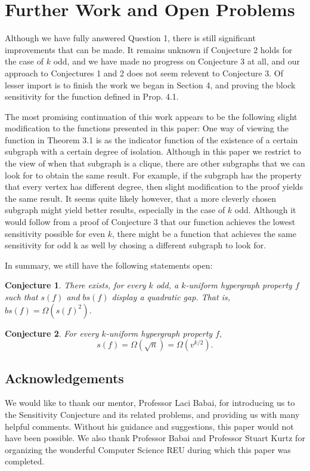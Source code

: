\documentclass[psamsfonts]{amsart}
\newtheorem*{conj*}{Conjecture}
\theoremstyle{definition}
\theoremstyle{remark}
\numberwithin{equation}{section}
\begin{document}
	\section{Further Work and Open Problems}
		Although we have fully answered Question 1, there is still significant improvements that can be made. It remains unknown if Conjecture 2 holds for the case of $k$ odd, and we have made no progress on Conjecture 3 at all, and our approach to Conjectures 1 and 2 does not seem relevent to Conjecture 3. Of lesser import is to finish the work we began in Section 4, and proving the block sensitivity for the function defined in Prop. 4.1.

		The most promising continuation of this work appears to be the following slight modification to the functions presented in this paper: One way of viewing the function in Theorem 3.1 is as the indicator function of the existence of a certain subgraph with a certain degree of isolation. Although in this paper we restrict to the view of when that subgraph is a clique, there are other subgraphs that we can look for to obtain the same result. For example, if the subgraph has the property that every vertex has different degree, then slight modification to the proof yields the same result. It seems quite likely however, that a more cleverly chosen subgraph might yield better results, especially in the case of $k$ odd. Although it would follow from a proof of Conjecture 3 that our function achieves the lowest sensitivity possible for even $k$, there might be a function that achieves the same sensitivity for odd k as well by chosing a different subgraph to look for.
	
	In summary, we still have the following statements open:
	\begin{conj*}
		There exists, for every $k$ odd, a $k$-uniform hypergraph property $f$ such that $s(f)$ and $bs(f)$ display a quadratic gap. That is,  $bs(f)=\Omega(s(f)^2)$.
	\end{conj*}
	
	\begin{conj*}
		For every $k$-uniform hypergraph property $f,$ $$s(f)=\Omega(\sqrt{n})=\Omega(v^{k/2}).$$
	\end{conj*}

	\subsection*{Acknowledgements}
		We would like to thank our mentor, Professor Laci Babai, for introducing us to the Sensitivity Conjecture and its related problems, and providing us with many helpful comments.  Without his guidance and suggestions, this paper would not have been possible.  We also thank Professor Babai and Professor Stuart Kurtz for organizing the wonderful Computer Science REU during which this paper was completed.  
\end{document}
